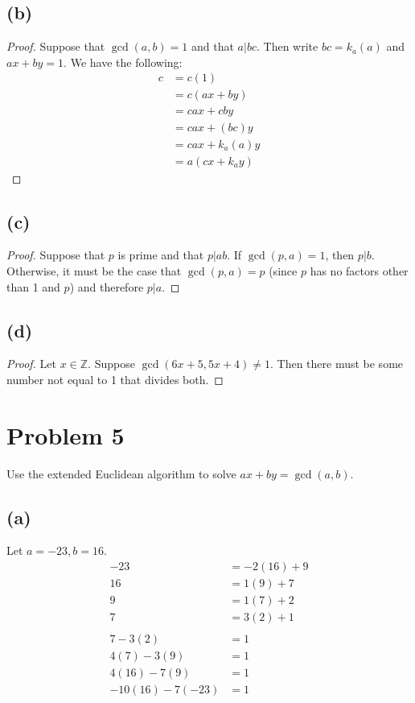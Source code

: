 \documentclass{article}
\theoremstyle{definition}
\begin{document}
    \subsection*{(b)}
    \begin{proof}
        Suppose that $\gcd(a,b) = 1$ and that $a | bc$.
        Then write $bc = k_a(a)$ and $ax + by = 1$. We have the following:
        \begin{align*}
            c & = c(1) \\
            &= c(ax + by) \\
            &= cax + cby \\
            &= cax + (bc) y \\
            &= cax + k_a(a) y \\
            &= a(cx + k_a y)
        \end{align*}
    \end{proof}
    \subsection*{(c)}
    \begin{proof}
        Suppose that $p$ is prime and that $p | ab$.
        If $\gcd(p,a) = 1$, then $p | b$. Otherwise, it must be the case that 
        $\gcd(p,a) = p$ (since $p$ has no factors other than 1 and $p$) and therefore $p | a$.
    \end{proof}
    \subsection*{(d)}
    \begin{proof}
        Let $x \in \mathbb{Z}$. Suppose $\gcd(6x +5, 5x + 4) \neq 1$.
        Then there must be some number not equal to 1 that divides both.
    \end{proof}
\section*{Problem 5}
Use the extended Euclidean algorithm to solve $ax + by = \gcd(a,b)$.
\subsection*{(a)}
Let $a=-23,b=16$.
\begin{align*}
    -23 &= -2(16) + 9 \\
    16 &= 1(9) + 7 \\
    9 &= 1(7) + 2 \\
    7 &= 3(2) + 1 \\\\
    7 - 3(2) &= 1 \\
    4(7) - 3(9) &= 1 \\
    4(16) - 7(9) &= 1 \\
    -10(16) - 7(-23) &= 1
\end{align*}
\end{document}
